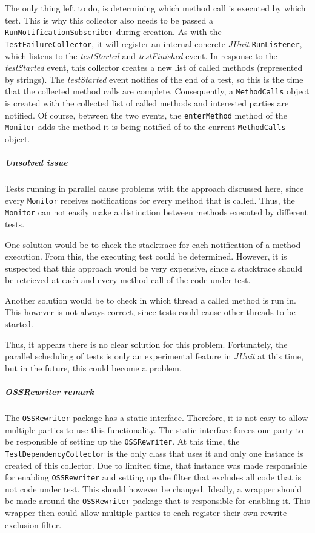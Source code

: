 \documentclass[i2]{oss}
\newcommand{\class}[1]{\texttt{#1}}
\newcommand{\method}[1]{\texttt{#1}}
\newcommand{\junit}{\emph{JUnit }}
\begin{document}
The only thing left to do, is determining which method call is executed by which test.
This is why this collector also needs to be passed a \class{RunNotificationSubscriber} during creation.
As with the \class{TestFailureCollector}, it will register an internal concrete \junit \class{RunListener}, which listens to the \emph{testStarted} and \emph{testFinished} event.
In response to the \emph{testStarted} event, this collector creates a new list of called methods (represented by strings).
The \emph{testStarted} event notifies of the end of a test, so this is the time that the collected method calls are complete. Consequently, a \class{MethodCalls} object is created with the collected list of called methods and interested parties are notified.
Of course, between the two events, the \method{enterMethod} method of the \class{Monitor} adds the method it is being notified of to the current \class{MethodCalls} object.

\subparagraph{Unsolved issue}

Tests running in parallel cause problems with the approach discussed here, since every \class{Monitor} receives notifications for every method that is called.
Thus, the \class{Monitor} can not easily make a distinction between methods executed by different tests.

One solution would be to check the stacktrace for each notification of a method execution. 
From this, the executing test could be determined.
However, it is suspected that this approach would be very expensive, since a stacktrace should be retrieved at each and every method call of the code under test.

Another solution would be to check in which thread a called method is run in.
This however is not always correct, since tests could cause other threads to be started.

Thus, it appears there is no clear solution for this problem.
Fortunately, the parallel scheduling of tests is only an experimental feature in \junit at this time, but in the future, this could become a problem.

\subparagraph{OSSRewriter remark}

The \class{OSSRewriter} package has a static interface.
Therefore, it is not easy to allow multiple parties to use this functionality.
The static interface forces one party to be responsible of setting up the \class{OSSRewriter}.
At this time, the \class{TestDependencyCollector} is the only class that uses it and only one instance is created of this collector.
Due to limited time, that instance was made responsible for enabling \class{OSSRewriter} and setting up the filter that excludes all code that is not code under test.
This should however be changed.
Ideally, a wrapper should be made around the \class{OSSRewriter} package that is responsible for enabling it.
This wrapper then could allow multiple parties to each register their own rewrite exclusion filter.
\end{document}
